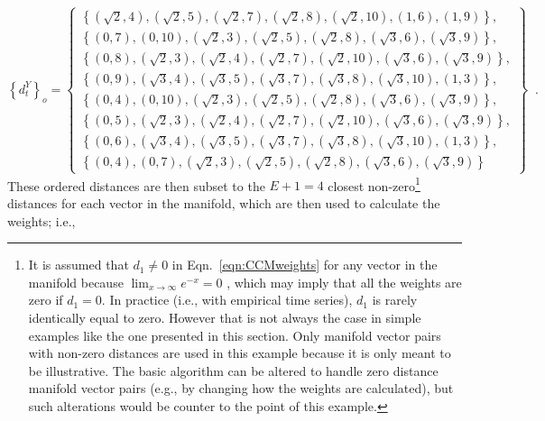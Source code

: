 \documentclass{article}[10pt]
\begin{document}
\begin{equation}
\left\{d_{t}^Y\right\}_o = \left\{\begin{array}{c} 
\left\{\left(\sqrt{2},4\right),\left(\sqrt{2},5\right),\left(\sqrt{2},7\right),\left(\sqrt{2},8\right),\left(\sqrt{2},10\right),\left(1,6\right),\left(1,9\right)\right\},\\
\left\{\left(0,7\right),\left(0,10\right),\left(\sqrt{2},3\right),\left(\sqrt{2},5\right),\left(\sqrt{2},8\right),\left(\sqrt{3},6\right),\left(\sqrt{3},9\right)\right\},\\
\left\{\left(0,8\right),\left(\sqrt{2},3\right),\left(\sqrt{2},4\right),\left(\sqrt{2},7\right),\left(\sqrt{2},10\right),\left(\sqrt{3},6\right),\left(\sqrt{3},9\right)\right\},\\
\left\{\left(0,9\right),\left(\sqrt{3},4\right),\left(\sqrt{3},5\right),\left(\sqrt{3},7\right),\left(\sqrt{3},8\right),\left(\sqrt{3},10\right),\left(1,3\right)\right\},\\
\left\{\left(0,4\right),\left(0,10\right),\left(\sqrt{2},3\right),\left(\sqrt{2},5\right),\left(\sqrt{2},8\right),\left(\sqrt{3},6\right),\left(\sqrt{3},9\right)\right\},\\
\left\{\left(0,5\right),\left(\sqrt{2},3\right),\left(\sqrt{2},4\right),\left(\sqrt{2},7\right),\left(\sqrt{2},10\right),\left(\sqrt{3},6\right),\left(\sqrt{3},9\right)\right\},\\
\left\{\left(0,6\right),\left(\sqrt{3},4\right),\left(\sqrt{3},5\right),\left(\sqrt{3},7\right),\left(\sqrt{3},8\right),\left(\sqrt{3},10\right),\left(1,3\right)\right\},\\
\left\{\left(0,4\right),\left(0,7\right),\left(\sqrt{2},3\right),\left(\sqrt{2},5\right),\left(\sqrt{2},8\right),\left(\sqrt{3},6\right),\left(\sqrt{3},9\right)\right\}
\end{array}\right\}\;\;.
\end{equation}
These ordered distances are then subset to the $E+1=4$ closest non-zero\footnote{It is assumed that $d_1\neq 0$ in Eqn.\ \ref{eqn:CCMweights} for any vector in the manifold because $\lim_{x\rightarrow \infty}e^{-x} = 0$ \cite{statsbook_placeholder}, which may imply that all the weights are zero if $d_1=0$.  In practice (i.e., with empirical time series), $d_1$ is rarely identically equal to zero.  However that is not always the case in simple examples like the one presented in this section.  Only manifold vector pairs with non-zero distances are used in this example because it is only meant to be illustrative.  The basic algorithm can be altered to handle zero distance manifold vector pairs (e.g., by changing how the weights are calculated), but such alterations would be counter to the point of this example.} distances for each vector in the manifold, which are then used to calculate the weights; i.e.,
\end{document}
